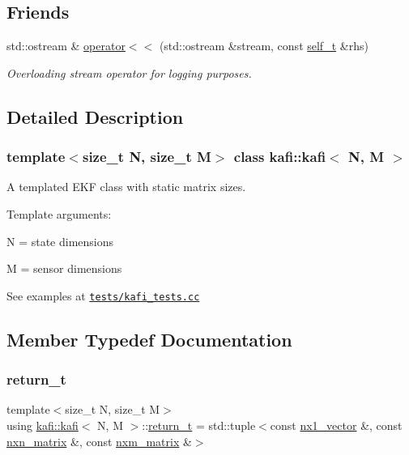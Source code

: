 \subsection*{Friends}
\begin{DoxyCompactItemize}
\item 
std\+::ostream \& \hyperlink{classkafi_1_1kafi_a648211fb566ac0cd37c803ea98783193}{operator$<$$<$} (std\+::ostream \&stream, const \hyperlink{classkafi_1_1kafi_a9fc1cf6d76a14493ec33c03f3a3699c7}{self\+\_\+t} \&rhs)
\begin{DoxyCompactList}\small\item\em Overloading stream operator for logging purposes. \end{DoxyCompactList}\end{DoxyCompactItemize}


\subsection{Detailed Description}
\subsubsection*{template$<$size\+\_\+t N, size\+\_\+t M$>$\newline
class kafi\+::kafi$<$ N, M $>$}

A templated E\+KF class with static matrix sizes. 

Template arguments\+:
\begin{DoxyItemize}
\item {\ttfamily N} = state dimensions
\item {\ttfamily M} = sensor dimensions
\end{DoxyItemize}

See examples at \href{../../tests/kafi_tests.cc}{\tt tests/kafi\+\_\+tests.\+cc} 

\subsection{Member Typedef Documentation}
\mbox{\label{classkafi_1_1kafi_a7dcd4a6f44ce454d56328f38ab053927}} 
\subsubsection{\texorpdfstring{return\+\_\+t}{return\_t}}
{\footnotesize\ttfamily template$<$size\+\_\+t N, size\+\_\+t M$>$ \\
using \hyperlink{classkafi_1_1kafi}{kafi\+::kafi}$<$ N, M $>$\+::\hyperlink{classkafi_1_1kafi_a7dcd4a6f44ce454d56328f38ab053927}{return\+\_\+t} =  std\+::tuple$<$const \hyperlink{classkafi_1_1kafi_a47144ae2efe936ede222eced035a6e46}{nx1\+\_\+vector} \&, const \hyperlink{classkafi_1_1kafi_a771d8045a61e16033e4a644675b5f4e7}{nxn\+\_\+matrix} \&, const \hyperlink{classkafi_1_1kafi_a637e94a4aa607b8c62ca61fb3d986430}{nxm\+\_\+matrix} \&$>$}



